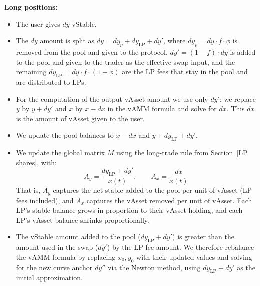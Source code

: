 \documentclass{article}
\begin{document}
\medskip
\noindent\textbf{Long positions:}
\begin{itemize}

\item The user gives $dy$ vStable.

\item The $dy$ amount is split as $dy = dy_p + dy_{\mathrm{LP}} + dy'$, where
      $dy_p = dy \cdot f \cdot \phi$ is removed from the pool and given to the protocol,
      $dy' = (1-f) \cdot dy$ is added to the pool and given to the trader as the effective
      swap input, and the remaining $dy_{\mathrm{LP}} = dy \cdot f \cdot (1-\phi)$ are the
      LP fees that stay in the pool and are distributed to LPs.

\item For the computation of the output vAsset amount we use only $dy'$: we replace $y$ by
      $y + dy'$ and $x$ by $x - dx$ in the vAMM formula and solve for $dx$. This $dx$ is
      the amount of vAsset given to the user.

\item We update the pool balances to $x - dx$ and $y + dy_{\mathrm{LP}} + dy'$.

\item We update the global matrix $M$ using the long-trade rule from
      Section~\ref{LP shares}, with:
      \begin{equation}
        A_y = \frac{dy_{\mathrm{LP}} + dy'}{x(t)}, \qquad A_x = \frac{dx}{x(t)}
      \end{equation}
      That is, $A_y$ captures the net stable added to the pool per unit of vAsset (LP fees
      included), and $A_x$ captures the vAsset removed per unit of vAsset. Each LP's stable
      balance grows in proportion to their vAsset holding, and each LP's vAsset balance
      shrinks proportionally.

\item The vStable amount added to the pool ($dy_{\mathrm{LP}} + dy'$) is greater than the
      amount used in the swap ($dy'$) by the LP fee amount. We therefore rebalance the vAMM
      formula by replacing $x_0, y_0$ with their updated values and solving for the new
      curve anchor $dy''$ via the Newton method, using $dy_{\mathrm{LP}} + dy'$ as the
      initial approximation.

\end{itemize}
\end{document}
